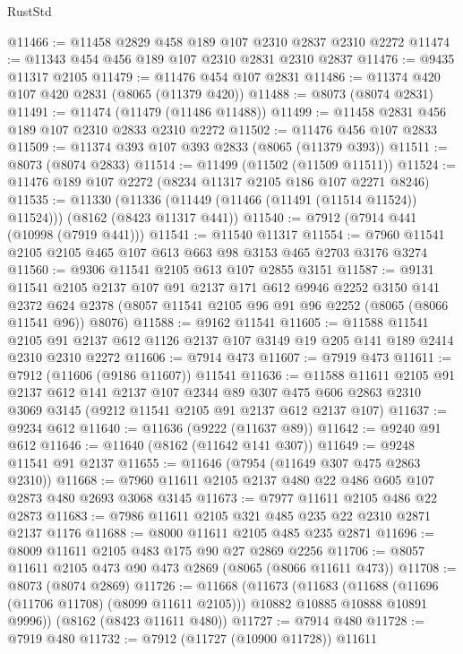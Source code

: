 \begin{lexlean}{RustStd}
\begin{coremodule}
@11466 := @11458 @2829 @458 @189 @107 @2310 @2837 @2310 @2272
@11474 := @11343 @454 @456 @189 @107 @2310 @2831 @2310 @2837
@11476 := @9435 @11317 @2105
@11479 := @11476 @454 @107 @2831
@11486 := @11374 @420 @107 @420 @2831 (@8065 (@11379 @420))
@11488 := @8073 (@8074 @2831)
@11491 := @11474 (@11479 (@11486 @11488))
@11499 := @11458 @2831 @456 @189 @107 @2310 @2833 @2310 @2272
@11502 := @11476 @456 @107 @2833
@11509 := @11374 @393 @107 @393 @2833 (@8065 (@11379 @393))
@11511 := @8073 (@8074 @2833)
@11514 := @11499 (@11502 (@11509 @11511))
@11524 := @11476 @189 @107 @2272 (@8234 @11317 @2105 @186 @107 @2271 @8246)
@11535 := @11330
    (@11336 (@11449 (@11466 (@11491 (@11514 @11524)) @11524)))
    (@8162 (@8423 @11317 @441))
@11540 := @7912 (@7914 @441 (@10998 (@7919 @441)))
@11541 := @11540 @11317
@11554 := @7960 @11541 @2105 @2105 @465 @107 @613 @663 @98 @3153 @465 @2703 @3176 @3274
@11560 := @9306 @11541 @2105 @613 @107 @2855 @3151
@11587 := @9131
    @11541
    @2105
    @2137
    @107
    @91
    @2137
    @171
    @612
    @9946
    @2252
    @3150
    @141
    @2372
    @624
    @2378
    (@8057 @11541 @2105 @96 @91 @96 @2252 (@8065 (@8066 @11541 @96)) @8076)
@11588 := @9162 @11541
@11605 := @11588
    @11541
    @2105
    @91
    @2137
    @612
    @1126
    @2137
    @107
    @3149
    @19
    @205
    @141
    @189
    @2414
    @2310
    @2310
    @2272
@11606 := @7914 @473
@11607 := @7919 @473
@11611 := @7912 (@11606 (@9186 @11607)) @11541
@11636 := @11588
    @11611
    @2105
    @91
    @2137
    @612
    @141
    @2137
    @107
    @2344
    @89
    @307
    @475
    @606
    @2863
    @2310
    @3069
    @3145
    (@9212 @11541 @2105 @91 @2137 @612 @2137 @107)
@11637 := @9234 @612
@11640 := @11636 (@9222 (@11637 @89))
@11642 := @9240 @91 @612
@11646 := @11640 (@8162 (@11642 @141 @307))
@11649 := @9248 @11541 @91 @2137
@11655 := @11646 (@7954 (@11649 @307 @475 @2863 @2310))
@11668 := @7960 @11611 @2105 @2137 @480 @22 @486 @605 @107 @2873 @480 @2693 @3068 @3145
@11673 := @7977 @11611 @2105 @486 @22 @2873
@11683 := @7986 @11611 @2105 @321 @485 @235 @22 @2310 @2871 @2137 @1176
@11688 := @8000 @11611 @2105 @485 @235 @2871
@11696 := @8009 @11611 @2105 @483 @175 @90 @27 @2869 @2256
@11706 := @8057 @11611 @2105 @473 @90 @473 @2869 (@8065 (@8066 @11611 @473))
@11708 := @8073 (@8074 @2869)
@11726 := @11668
    (@11673
      (@11683
        (@11688 (@11696 (@11706 @11708) (@8099 @11611 @2105)))
        @10882
        @10885
        @10888
        @10891
        @9996))
    (@8162 (@8423 @11611 @480))
@11727 := @7914 @480
@11728 := @7919 @480
@11732 := @7912 (@11727 (@10900 @11728)) @11611

\end{coremodule}
\end{lexlean}
